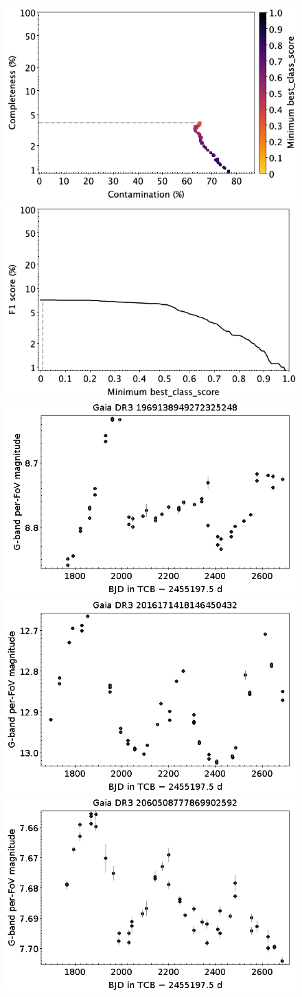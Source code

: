 \documentclass[longauth]{aa}
\begin{document}
\begin{appendix}
\begin{figure}
\centering
{} \includegraphics[width=0.45\hsize]{figures/appendix/BE_cls_scc.png}  
\hspace{2mm}
 \includegraphics[width=0.45\hsize]{figures/appendix/BE_cls_sf1.png} \\ 
\vspace{4mm}
 \includegraphics[width=0.45\hsize]{figures/appendix/BE-9.png}  
\hspace{2mm}
 \includegraphics[width=0.45\hsize]{figures/appendix/BE-25.png} \\
\vspace{4mm}
 \includegraphics[width=0.45\hsize]{figures/appendix/BE-29.png}  

\end{figure}
\end{appendix}
\end{document}
